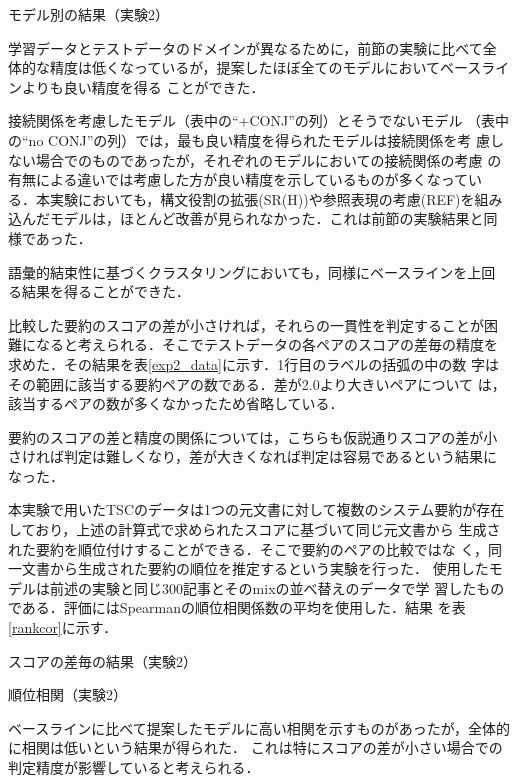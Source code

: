 \documentclass[japanese]{jnlp_1.4}
\begin{document}
\begin{table}[b]
  \caption{モデル別の結果（実験2）}\label{exp2_model}

\end{table}


 学習データとテストデータのドメインが異なるために，前節の実験に比べて全
 体的な精度は低くなっているが，提案したほぼ全てのモデルにおいてベースラインよりも良い精度を得る
 ことができた．

 接続関係を考慮したモデル（表中の``+CONJ''の列）とそうでないモデル
 （表中の``no CONJ''の列）では，最も良い精度を得られたモデルは接続関係を考
 慮しない場合でのものであったが，それぞれのモデルにおいての接続関係の考慮
 の有無による違いでは考慮した方が良い精度を示しているものが多くなってい
 る．本実験においても，構文役割の拡張(SR(H))や参照表現の考慮(REF)を組み
 込んだモデルは，ほとんど改善が見られなかった．これは前節の実験結果と同
 様であった．


 語彙的結束性に基づくクラスタリングにおいても，同様にベースラインを上回
 る結果を得ることができた．



 比較した要約のスコアの差が小さければ，それらの一貫性を判定することが困
 難になると考えられる．そこでテストデータの各ペアのスコアの差毎の精度を
 求めた．その結果を表\ref{exp2_data}に示す．1行目のラベルの括弧の中の数
 字はその範囲に該当する要約ペアの数である．差が2.0より大きいペアについて
 は，該当するペアの数が多くなかったため省略している．

 要約のスコアの差と精度の関係については，こちらも仮説通りスコアの差が小
 さければ判定は難しくなり，差が大きくなれば判定は容易であるという結果に
 なった．
 

 本実験で用いたTSCのデータは1つの元文書に対して複数のシステム要約が存在
 しており，上述の計算式で求められたスコアに基づいて同じ元文書から
 生成された要約を順位付けすることができる．そこで要約のペアの比較ではな
 く，同一文書から生成された要約の順位を推定するという実験を行った．
 使用したモデルは前述の実験と同じ300記事とそのmixの並べ替えのデータで学
 習したものである．評価にはSpearmanの順位相関係数の平均を使用した．結果
 を表\ref{rankcor}に示す．

\begin{table}[t]
  \caption{スコアの差毎の結果（実験2）}\label{exp2_data}

\end{table}
\begin{table}[t]
  \caption{順位相関（実験2）}\label{rankcor}

\end{table}

ベースラインに比べて提案したモデルに高い相関を示すものがあったが，全体的に相関は低いという結果が得られた．
これは特にスコアの差が小さい場合での判定精度が影響していると考えられる．
\end{document}
